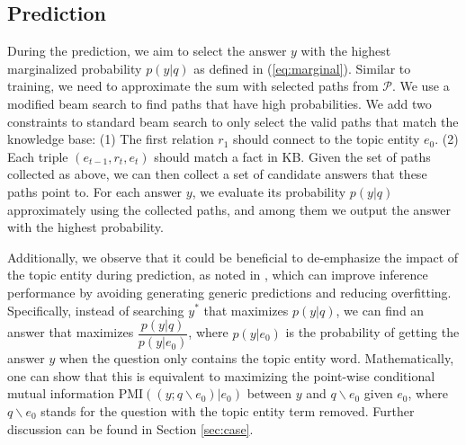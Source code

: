 \subsection{Prediction} \label{sec:pmi}

During the prediction, we aim to select the answer $y$ with the highest marginalized probability $p(y|q)$ as defined in (\ref{eq:marginal}). Similar to training, we need to approximate the sum with selected paths from $\mathcal{P}$. We use a modified beam search to find paths that have high probabilities. We add two constraints to standard beam search to only select the valid paths that match the knowledge base: (1) The first relation $r_1$ should connect to the topic entity $e_0$. (2) Each triple $(e_{t-1},r_t,e_t)$ should match a fact in KB. Given the set of paths collected as above, we can then collect a set of candidate answers that these paths point to. For each answer $y$, we evaluate its probability $p(y|q)$
approximately using the collected paths, and among them we output the answer with the highest probability.




Additionally, we observe that it could be beneficial to de-emphasize the impact of the topic entity during prediction, as noted in \cite{DBLP:conf/naacl/LiGBGD16}, which can improve inference performance by avoiding generating generic predictions and reducing overfitting. Specifically, instead of searching $y^*$ that maximizes $p(y|q)$, we can find an answer that maximizes $\dfrac{p(y|q)}{p(y|e_0)}$, where $p(y|e_0)$ is the probability of getting the answer $y$ when the question only contains the topic entity word. Mathematically, one can show that this is equivalent to maximizing the point-wise conditional mutual information PMI$((y;q\backslash e_0)|e_0)$ between $y$ and $q\backslash e_0$ given $e_0$, where $q\backslash e_0$ stands for the question with the topic entity term removed. Further discussion can be found in Section \ref{sec:case}.




